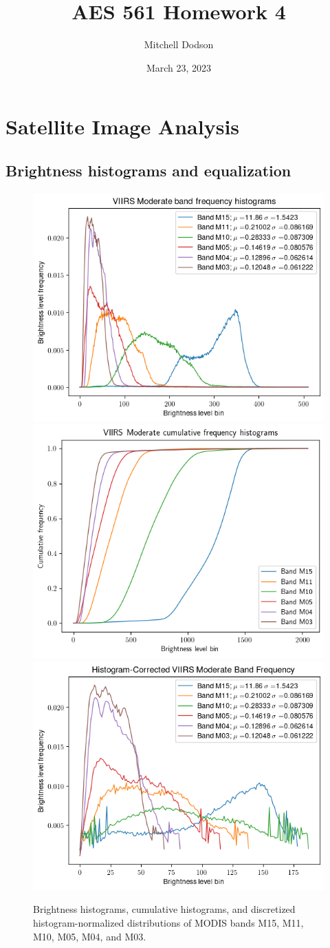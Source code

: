 \documentclass[12pt]{article}
\title{AES 561 Homework 4}
\author{Mitchell Dodson}
\date{March 23, 2023}
\begin{document}
\maketitle

\section{Satellite Image Analysis}

\subsection{Brightness histograms and equalization}

\begin{figure}[h!]
    \centering
    \includegraphics[width=.48\linewidth]{figures/p1/mod_histograms.png}
    \includegraphics[width=.48\linewidth]{figures/p1/mod_cumulative.png}
    \includegraphics[width=.48\linewidth]{figures/p1/mod_histograms_correct.png}
    \caption{Brightness histograms, cumulative histograms, and discretized histogram-normalized distributions of MODIS bands M15, M11, M10, M05, M04, and M03.}
    \label{p1_histograms}
\end{figure}
\end{document}
